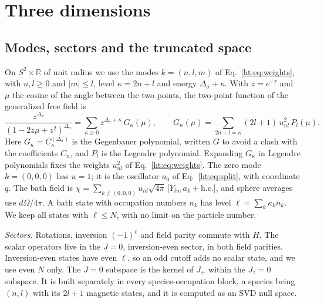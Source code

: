 \section{Three dimensions}\label{ht:d3:sec}

\subsection{Modes, sectors and the truncated space}\label{ht:d3:modes}

On $S^2\times\mathbb R$ of unit radius we use the modes $k=(n,l,m)$ of Eq.~\eqref{ht:eq:weights}, with $n,l\geq0$ and
$|m|\leq l$, level $\kappa=2n+l$ and energy $\Delta_\sigma+\kappa$. With $z=e^{-\tau}$ and $\mu$ the cosine of the
angle between the two points, the two-point function of the generalized free field is
\begin{equation}
 \frac{z^{\Delta_\sigma}}{(1-2z\mu+z^2)^{\Delta_\sigma}}=\sum_{\kappa\geq0}z^{\Delta_\sigma+\kappa}\,G_\kappa(\mu),\qquad
 G_\kappa(\mu)=\sum_{2n+l=\kappa}(2l+1)\,u_{nl}^2\,P_l(\mu).
 \label{ht:d3:weights}
\end{equation}
Here $G_\kappa=C_\kappa^{(\Delta_\sigma)}$ is the Gegenbauer polynomial, written $G$ to avoid a clash with the
coefficients $C_n$, and $P_l$ is the Legendre polynomial. Expanding $G_\kappa$ in Legendre polynomials fixes the
weights $u_{nl}^2$ of Eq.~\eqref{ht:eq:weights}. The zero mode $k=(0,0,0)$ has $u=1$; it is the oscillator $a_0$ of
Eq.~\eqref{ht:eq:split}, with coordinate $q$. The bath field is
$\chi=\sum_{k\neq(0,0,0)}u_{nl}\sqrt{4\pi}\,\big[Y_{lm}\,a_k+\text{h.c.}\big]$, and sphere averages use
$d\Omega/4\pi$. A bath state with occupation numbers $n_k$ has level $\ell=\sum_k\kappa_k n_k$. We keep all states
with $\ell\leq N$, with no limit on the particle number.

\textit{Sectors.} Rotations, inversion $(-1)^\ell$ and field parity commute with $H$. The scalar operators live in
the $J=0$, inversion-even sector, in both field parities. Inversion-even states have even $\ell$, so an odd cutoff
adds no scalar state, and we use even $N$ only. The $J=0$ subspace is the kernel of $J_+$ within the $J_z=0$
subspace. It is built separately in every species-occupation block, a species being $(n,l)$ with its $2l+1$ magnetic
states, and it is computed as an SVD null space.

